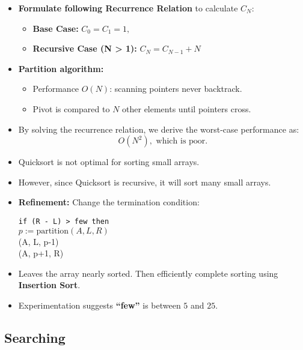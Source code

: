 \documentclass[a4paper,12pt]{article}
\begin{document}
\begin{itemize}
    \item \textbf{Formulate following Recurrence Relation} to calculate \(C_N\):
    \begin{itemize}
        \item \textbf{Base Case:} \(C_0 = C_1 = 1,\)
        \item \textbf{Recursive Case (N > 1):} \(C_N = C_{N-1} + N\)
    \end{itemize}
    \item \textbf{Partition algorithm:}
    \begin{itemize}
        \item Performance \(O(N)\): scanning pointers never backtrack.
        \item Pivot is compared to \(N\) other elements until pointers cross.
    \end{itemize}
    \item By solving the recurrence relation, we derive the worst-case performance as:
    \[
    O(N^2), \text{ which is poor.}
    \]
\end{itemize}

\begin{itemize}
    \item Quicksort is not optimal for sorting small arrays.
    \item However, since Quicksort is recursive, it will sort many small arrays.
    \item \textbf{Refinement:} Change the termination condition:
    \begin{tcolorbox}[colframe=black, colback=white]
    \texttt{if (R - L) > few then} \\
    \hspace*{1cm} \(p := \text{partition}(A, L, R)\) \\
    \hspace*{1cm} (A, L, p-1) \\
    \hspace*{1cm} (A, p+1, R)
    \end{tcolorbox}
    \item Leaves the array nearly sorted. Then efficiently complete sorting using \textbf{Insertion Sort}.
    \item Experimentation suggests \textbf{“few”} is between \(5\) and \(25\).
\end{itemize}

\subsection{Searching}
\end{document}
